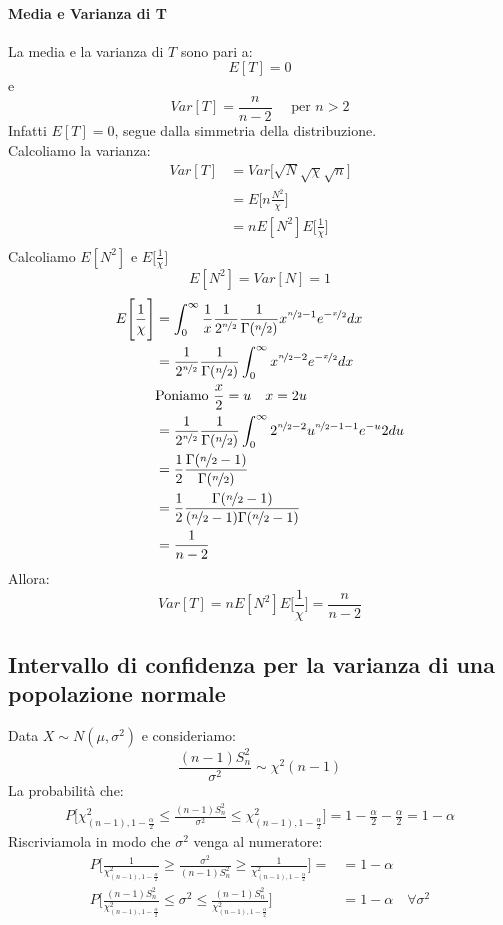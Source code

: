 \documentclass[12pt]{report}
\begin{document}
	\paragraph{Media e Varianza di T} La media e la varianza di $T$ sono pari a:
	\[
	E[T] = 0
	\]
	e
	\[
	Var[T] = \frac{n}{n-2} \quad \text{ per } n > 2
	\]
	Infatti $E[T] = 0$, segue dalla simmetria della distribuzione.  \\
	Calcoliamo la varianza:
	\begin{align*}
		Var[T] &= Var\Bigg[\sqrt{N}{\sqrt{\chi}}\sqrt{n}\Bigg] \\
		&= E\Bigg[n\frac{N^2}{\chi}\Bigg] \\
		&= nE[N^2]E\Bigg[\frac{1}{\chi}\Bigg] \\
	\end{align*}
		Calcoliamo $E[N^2]$ e $E\Bigg[\frac{1}{\chi}\Bigg]$
		\[E[N^2] = Var[N] = 1 \]
	\begin{align*}
	E\Bigg[\frac{1}{\chi}\Bigg] &= \int_{0}^{\infty}\frac{1}{x}\frac{1}{2^{\nicefrac{n}{2}}}\frac{1}{\Gamma(\nicefrac{n}{2})}x^{\nicefrac{n}{2} - 1}e^{-\nicefrac{x}{2}}dx \\
	&= \frac{1}{2^{\nicefrac{n}{2}}}\frac{1}{\Gamma(\nicefrac{n}{2})}\int_{0}^{\infty}x^{\nicefrac{n}{2} - 2}e^{-\nicefrac{x}{2}}dx \\
	& \text{Poniamo } \frac{x}{2} = u \quad x = 2u \\
	&= \frac{1}{2^{\nicefrac{n}{2}}}\frac{1}{\Gamma(\nicefrac{n}{2})}\int_{0}^{\infty}2^{\nicefrac{n}{2}-2}u^{\nicefrac{n}{2}-1-1}e^{-u}2du \\
	&= \frac{1}{2}\frac{\Gamma(\nicefrac{n}{2} - 1)}{\Gamma(\nicefrac{n}{2})} \\
	&= \frac{1}{2}\frac{\Gamma(\nicefrac{n}{2} - 1)}{(\nicefrac{n}{2} - 1)\Gamma(\nicefrac{n}{2} - 1)} \\
	&= \frac{1}{n-2}
	\end{align*}
	Allora:
	\[
	Var[T] = nE[N^2]E\Bigg[\frac{1}{\chi}\Bigg] = \frac{n}{n-2}
	\]
	 \subsection{Intervallo di confidenza per la varianza di una popolazione normale}
	 Data $X \sim N(\mu, \sigma^2)$ e consideriamo:
	 \[
	 \frac{(n-1)S_n^2}{\sigma^2} \sim \chi^2(n-1)
	 \]
	 La probabilità che:
	 \begin{align*}
	 	P\Bigg[\chi^2_{(n-1), 1 - \frac{\alpha}{2}} \leq \frac{(n-1)S_n^2}{\sigma^2} \leq \chi^2_{(n-1), 1-\frac{\alpha}{2}}\Bigg] = 1-\frac{\alpha}{2} - \frac{\alpha}{2} = 1 - \alpha
	 \end{align*}
	 Riscriviamola in modo che $\sigma^2$ venga al numeratore:
	 \begin{align*}
	 	P\Bigg[\frac{1}{\chi^2_{(n-1), 1 - \frac{\alpha}{2}}} \geq \frac{\sigma^2}{(n-1)S_n^2} \geq \frac{1}{\chi^2_{(n-1), 1-\frac{\alpha}{2}}}\Bigg] = &= 1 - \alpha \\
	 	P\Bigg[\frac{(n-1)S_n^2}{\chi^2_{(n-1), 1 - \frac{\alpha}{2}}} \leq \sigma^2 \leq \frac{(n-1)S_n^2}{\chi^2_{(n-1), 1-\frac{\alpha}{2}}}\Bigg] &= 1 - \alpha \quad \forall \sigma^2
	 \end{align*}
\end{document}
